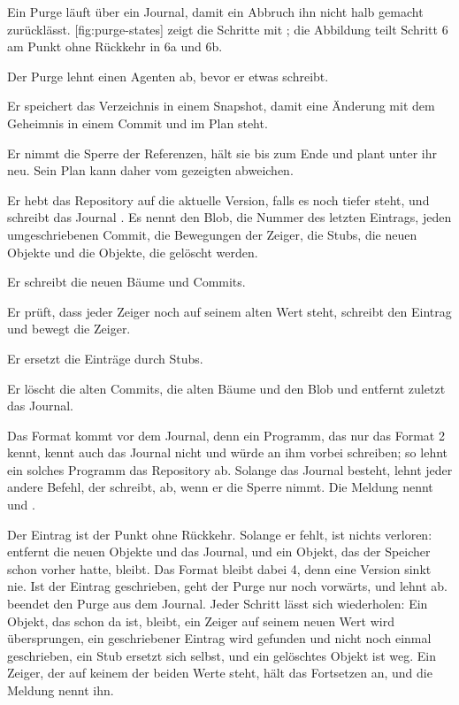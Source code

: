 {Ein Purge läuft über ein Journal, damit ein Abbruch ihn nicht halb gemacht zurücklässt.
[fig:purge-states] zeigt die Schritte mit ;
die Abbildung teilt Schritt 6 am Punkt ohne Rückkehr in 6a und 6b.

\startitemize[n]
\item Der Purge lehnt einen Agenten ab, bevor er etwas schreibt.
\item Er speichert das Verzeichnis in einem Snapshot,
damit eine Änderung mit dem Geheimnis in einem Commit und im Plan steht.
\item Er nimmt die Sperre der Referenzen, hält sie bis zum Ende und plant unter ihr neu.
Sein Plan kann daher vom gezeigten abweichen.
\item Er hebt das Repository auf die aktuelle Version, falls es noch tiefer steht,
und schreibt das Journal .
Es nennt den Blob, die Nummer des letzten Eintrags, jeden umgeschriebenen Commit,
die Bewegungen der Zeiger, die Stubs, die neuen Objekte und die Objekte, die gelöscht werden.
\item Er schreibt die neuen Bäume und Commits.
\item Er prüft, dass jeder Zeiger noch auf seinem alten Wert steht,
schreibt den Eintrag  und bewegt die Zeiger.
\item Er ersetzt die Einträge durch Stubs.
\item Er löscht die alten Commits, die alten Bäume und den Blob
und entfernt zuletzt das Journal.
\stopitemize

Das Format kommt vor dem Journal,
denn ein Programm, das nur das Format 2 kennt, kennt auch das Journal nicht
und würde an ihm vorbei schreiben; so lehnt ein solches Programm das Repository ab.
Solange das Journal besteht, lehnt jeder andere Befehl, der schreibt, ab,
wenn er die Sperre nimmt.
Die Meldung nennt  und .

\startplacefigure[title={Zustände eines Purge mit \type{--resume} und \type{--abort}},
    reference=fig:purge-states,location=here]
\stopplacefigure

Der Eintrag  ist der Punkt ohne Rückkehr.
Solange er fehlt, ist nichts verloren:
 entfernt die neuen Objekte und das Journal,
und ein Objekt, das der Speicher schon vorher hatte, bleibt.
Das Format bleibt dabei 4, denn eine Version sinkt nie.
Ist der Eintrag geschrieben, geht der Purge nur noch vorwärts, und  lehnt ab.
 beendet den Purge aus dem Journal.
Jeder Schritt lässt sich wiederholen:
Ein Objekt, das schon da ist, bleibt, ein Zeiger auf seinem neuen Wert wird übersprungen,
ein geschriebener Eintrag  wird gefunden und nicht noch einmal geschrieben,
ein Stub ersetzt sich selbst, und ein gelöschtes Objekt ist weg.
Ein Zeiger, der auf keinem der beiden Werte steht, hält das Fortsetzen an,
und die Meldung nennt ihn.

}
